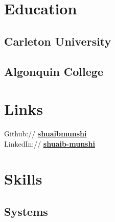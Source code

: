 \documentclass[letterpaper]{deedy-resume} %
\begin{document}
\begin{minipage}[t]{0.33\textwidth} %


\section{Education} 

\subsection{Carleton University}

\sectionspace %

\subsection{Algonquin College}


\sectionspace %


\section{Links} 

Github:// \href{https://github.com/shuaibmunshi}{\bf shuaibmunshi} \\
LinkedIn:// \href{https://www.linkedin.com/in/shuaib-munshi/}{\bf shuaib-munshi}

\sectionspace %

\section{Skills}

\subsection{Systems}


\end{minipage}
\end{document}
